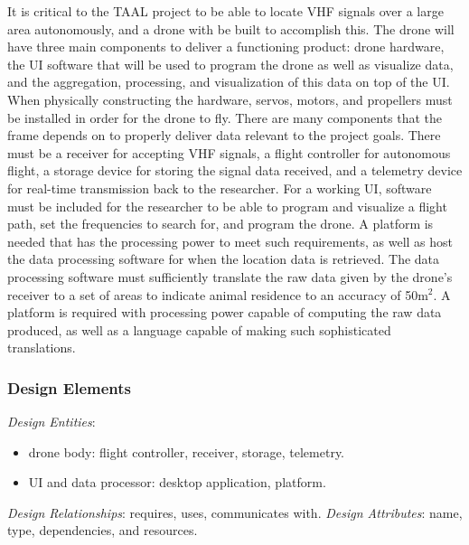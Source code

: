 \documentclass[onecolumn, draftclsnofoot,10pt, compsoc]{IEEEtran}
\begin{document}
It is critical to the TAAL project to be able to locate VHF signals over a large area autonomously, and a drone with be built to accomplish this.
The drone will have three main components to deliver a functioning product: drone hardware, the UI software that will be used to program the drone as well as visualize data, and the aggregation, processing, and visualization of this data on top of the UI.
\newline
\newline
When physically constructing the hardware, servos, motors, and propellers must be installed in order for the drone to fly. There are many components that the frame depends on to properly deliver data relevant to the project goals. 
\newline
\newline
There must be a receiver for accepting VHF signals, a flight controller for autonomous flight, a storage device for storing the signal data received, and a telemetry device for real-time transmission back to the researcher.
\newline
\newline
For a working UI, software must be included for the researcher to be able to program and visualize a flight path, set the frequencies to search for, and program the drone.
A platform is needed that has the processing power to meet such requirements, as well as host the data processing software for when the location data is retrieved.
\newline
\newline
The data processing software must sufficiently translate the raw data given by the drone's receiver to a set of areas to indicate animal residence to an accuracy of 50m$^2$.
A platform is required with processing power capable of computing the raw data produced, as well as a language capable of making such sophisticated translations.

\subsubsection{Design Elements}

\textit{Design Entities}: 
\begin{itemize}
    \item drone body: flight controller, receiver, storage, telemetry.
    \item UI and data processor: desktop application, platform.
\end{itemize}
\textit{Design Relationships}: requires, uses, communicates with.\newline
\textit{Design Attributes}: name, type, dependencies, and resources.
\end{document}
